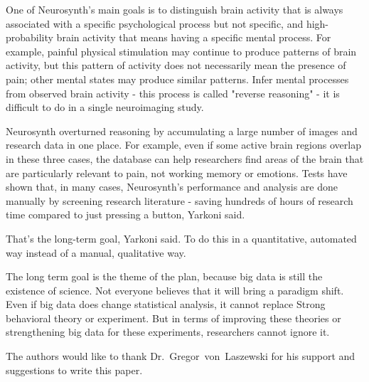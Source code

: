 One of Neurosynth's main goals is to distinguish brain activity that is always associated with a specific psychological process but not specific, and high-probability brain activity that means having a specific mental process. For example, painful physical stimulation may continue to produce patterns of brain activity, but this pattern of activity does not necessarily mean the presence of pain; other mental states may produce similar patterns. Infer mental processes from observed brain activity - this process is called "reverse reasoning" - it is difficult to do in a single neuroimaging study.

Neurosynth overturned reasoning by accumulating a large number of images and research data in one place. For example, even if some active brain regions overlap in these three cases, the database can help researchers find areas of the brain that are particularly relevant to pain, not working memory or emotions. Tests have shown that, in many cases, Neurosynth's performance and analysis are done manually by screening research literature - saving hundreds of hours of research time compared to just pressing a button, Yarkoni said.

That’s the long-term goal, Yarkoni said. To do this in a quantitative, automated way instead of a manual, qualitative way\cite{editor01}.

The long term goal is the theme of the plan, because big data is still the existence of science. Not everyone believes that it will bring a paradigm shift. Even if big data does change statistical analysis, it cannot replace Strong behavioral theory or experiment. But in terms of improving these theories or strengthening big data for these experiments, researchers cannot ignore it.

\begin{acks}

  The authors would like to thank Dr.~Gregor~von~Laszewski for his
  support and suggestions to write this paper.

\end{acks}



 

